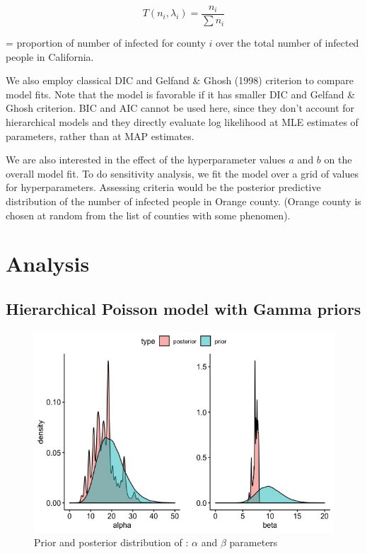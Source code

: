 \documentclass[11pt,twocolumn]{asaproc}
\begin{document}
$$T(n_i, \lambda_i) = \frac{n_i}{\sum n_i}$$ 

= proportion of number of infected for county $i$ over the total number of infected people in California.


We also employ classical DIC and Gelfand \& Ghosh (1998) criterion to compare model fits. Note that the model is favorable if it has smaller DIC and Gelfand \& Ghosh criterion. BIC and AIC cannot be used here, since they don't account for hierarchical models and they directly evaluate log likelihood at MLE estimates of parameters, rather than at MAP estimates.


We are also interested in the effect of the hyperparameter values $a$ and $b$ on the overall model fit. To do sensitivity analysis, we fit the model over a grid of values for hyperparameters. Assessing criteria would be the posterior predictive distribution of the number of infected people in Orange county. (Orange county is chosen at random from the list of counties with some phenomen).







\section{Analysis}

\subsection{Hierarchical Poisson model with Gamma priors}

\begin{figure}[t]
\centering\includegraphics[scale=.30]{prior_post.jpeg}
\caption{Prior and posterior distribution of : $\alpha$ and $\beta$ parameters}
\label{fig:priorpost}
\end{figure}
\end{document}
